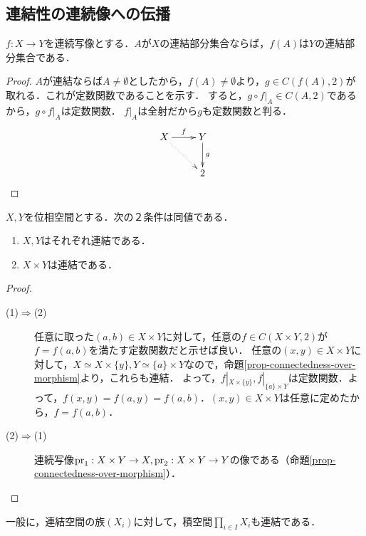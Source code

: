 \documentclass[uplatex,dvipdfmx]{jsreport}
\begin{document}
\subsection{連結性の連続像への伝播}

\begin{proposition}[連続写像は連結性を保存する]\label{prop-connectedness-over-morphism}
    $f:X\to Y$を連続写像とする．$A$が$X$の連結部分集合ならば，$f(A)$は$Y$の連結部分集合である．
\end{proposition}
\begin{proof}
    $A$が連結ならば$A\ne\emptyset$としたから，$f(A)\ne\emptyset$より，$g\in C(f(A),2)$が取れる．これが定数関数であることを示す．
    すると，$g\circ f|_A\in C(A,2)$であるから，$g\circ f|_A$は定数関数．
    $f|_A$は全射だから$g$も定数関数と判る．
    \[\xymatrix{
        X\ar[r]^-f\ar@{.>}[dr]&Y\ar[d]^-g\\
        &2
    }\]
\end{proof}

\begin{corollary}[積への伝播]
    $X,Y$を位相空間とする．次の２条件は同値である．
    \begin{enumerate}
        \item $X,Y$はそれぞれ連結である．
        \item $X\times Y$は連結である．
    \end{enumerate}
\end{corollary}
\begin{proof}\mbox{}
    \begin{description}
        \item[(1)$\Rightarrow$(2)] 
        任意に取った$(a,b)\in X\times Y$に対して，任意の$f\in C(X\times Y,2)$が$f=f(a,b)$を満たす定数関数だと示せば良い．
        任意の$(x,y)\in X\times Y$に対して，$X\simeq X\times\{y\},Y\simeq\{a\}\times Y$なので，命題\ref{prop-connectedness-over-morphism}より，これらも連結．
        よって，$f|_{X\times\{y\}},f|_{\{a\}\times Y}$は定数関数．よって，$f(x,y)=f(a,y)=f(a,b)$．$(x,y)\in X\times Y$は任意に定めたから，$f=f(a,b)$．
        \item[(2)$\Rightarrow$(1)]
        連続写像$\mathrm{pr}_1:X\times Y\to X,\mathrm{pr}_2:X\times Y\to Y$の像である（命題\ref{prop-connectedness-over-morphism}）．
    \end{description}
\end{proof}

\begin{proposition}[AC]
    一般に，連結空間の族$(X_i)$に対して，積空間$\prod_{i\in I}X_i$も連結である．
\end{proposition}
\end{document}
